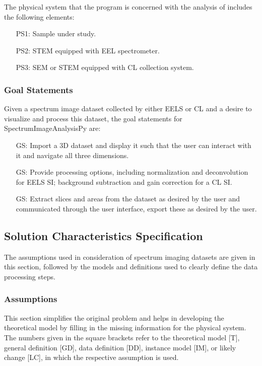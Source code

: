 \documentclass[12pt]{article}
\newcounter{goalnum} %
\newcommand{\progname}{SpectrumImageAnalysisPy} %
\begin{document}
The physical system that the program is concerned with the analysis of includes the following elements:

\begin{itemize}
	\item[PS1:] Sample under study.
	\item[PS2:] STEM equipped with EEL spectrometer.
	\item[PS3:] SEM or STEM equipped with CL collection system.
\end{itemize}

\subsubsection{Goal Statements}

\noindent Given a spectrum image dataset collected by either EELS or CL and a desire to visualize and process this dataset, the goal statements for \progname{} are:

\begin{itemize}
	\item[GS\refstepcounter{goalnum}\thegoalnum \label{G_ImportDisplay}:] Import a 3D dataset and display it such that the user can interact with it and navigate all three dimensions.
	\item[GS\refstepcounter{goalnum}\thegoalnum \label{G_Processing}:] Provide processing options, including normalization and deconvolution for EELS SI; background subtraction and gain correction for a CL SI.
	\item[GS\refstepcounter{goalnum}\thegoalnum \label{G_Extraction}:] Extract slices and areas from the dataset as desired by the user and communicated through the user interface, export these as desired by the user.
\end{itemize}

\subsection{Solution Characteristics Specification}

The assumptions used in consideration of spectrum imaging datasets are given in this section, followed by the models and definitions used to clearly define the data processing steps.

\subsubsection{Assumptions}

This section simplifies the original problem and helps in developing the
theoretical model by filling in the missing information for the physical
system. The numbers given in the square brackets refer to the theoretical model
[T], general definition [GD], data definition [DD], instance model [IM], or
likely change [LC], in which the respective assumption is used.
\end{document}
